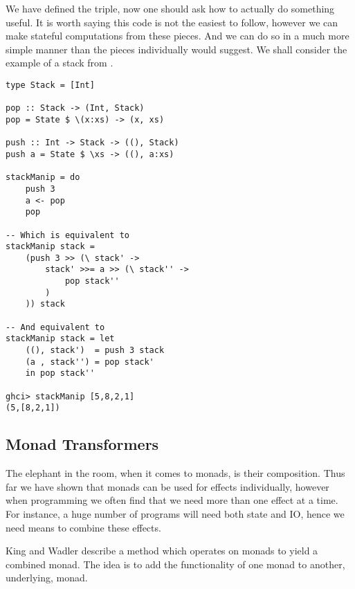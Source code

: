 We have defined the triple,
now one should ask how to actually do something useful.
It is worth saying this code is not the easiest to follow,
however we can make stateful computations from these pieces.
And we can do so in a much more simple manner than the
pieces individually would suggest.
We shall consider the example of a stack from \cite{lipovaca2011learn}.
\begin{verbatim}
type Stack = [Int]

pop :: Stack -> (Int, Stack)
pop = State $ \(x:xs) -> (x, xs)

push :: Int -> Stack -> ((), Stack)
push a = State $ \xs -> ((), a:xs)

stackManip = do
    push 3
    a <- pop
    pop

-- Which is equivalent to
stackManip stack =
    (push 3 >> (\ stack' ->
        stack' >>= a >> (\ stack'' ->
            pop stack''
        )
    )) stack

-- And equivalent to
stackManip stack = let
    ((), stack')  = push 3 stack
    (a , stack'') = pop stack'
    in pop stack''

ghci> stackManip [5,8,2,1]
(5,[8,2,1])
\end{verbatim}

\subsection{Monad Transformers}
The elephant in the room, when it comes to monads, is their composition.
Thus far we have shown that monads can be used for effects individually,
however when programming we often find that we need more than one effect
at a time.
For instance, a huge number of programs will need both state and IO,
hence we need means to combine these effects.

King and Wadler \cite{king1993combining}
describe a method which operates on monads to yield a combined monad.
The idea is to add the functionality of one monad to another, underlying, monad.

